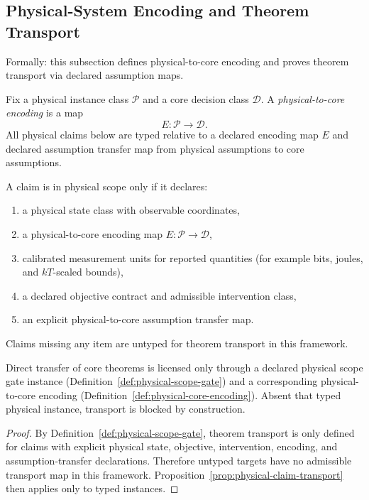 \subsection{Physical-System Encoding and Theorem Transport}\label{sec:physical-transport}

Formally: this subsection defines physical-to-core encoding and proves theorem transport via declared assumption maps.

\begin{definition}\label{def:physical-core-encoding}
Fix a physical instance class $\mathcal{P}$ and a core decision class $\mathcal{D}$. A \emph{physical-to-core encoding} is a map
\[
E:\mathcal{P}\to\mathcal{D}.
\]
All physical claims below are typed relative to a declared encoding map $E$ and declared assumption transfer map from physical assumptions to core assumptions.
\end{definition}

\begin{definition}\label{def:physical-scope-gate}
A claim is in physical scope only if it declares:
\begin{enumerate}
\item a physical state class with observable coordinates,
\item a physical-to-core encoding map \(E:\mathcal{P}\to\mathcal{D}\),
\item calibrated measurement units for reported quantities (for example bits, joules, and \(kT\)-scaled bounds),
\item a declared objective contract and admissible intervention class,
\item an explicit physical-to-core assumption transfer map.
\end{enumerate}
Claims missing any item are untyped for theorem transport in this framework.
\end{definition}

\begin{proposition}\label{prop:typed-physical-transport-requirement}
Direct transfer of core theorems is licensed only through a declared physical scope gate instance (Definition~\ref{def:physical-scope-gate}) and a corresponding physical-to-core encoding (Definition~\ref{def:physical-core-encoding}). Absent that typed physical instance, transport is blocked by construction.
\end{proposition}

\begin{proof}
By Definition~\ref{def:physical-scope-gate}, theorem transport is only defined for claims with explicit physical state, objective, intervention, encoding, and assumption-transfer declarations. Therefore untyped targets have no admissible transport map in this framework. Proposition~\ref{prop:physical-claim-transport} then applies only to typed instances.
\end{proof}

